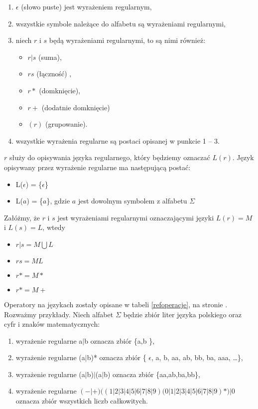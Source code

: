 \begin{enumerate}
 \item    $\epsilon$ (słowo puste) jest wyrażeniem regularnym,
 \item wszystkie symbole należące do alfabetu są wyrażeniami regularnymi,
 \item niech $r$ i $s$ będą wyrażeniami regularnymi, to są nimi również:
      \begin{itemize}
	\item	$r|s$  (suma),
	\item	$rs$   (łączność) ,
	\item   $r*$   (domknięcie),
	\item   $r+$   (dodatnie domknięcie)
	\item   $(r)$  (grupowanie).
      \end{itemize}
\item wszystkie wyrażenia regularne są postaci opisanej w punkcie 1 -- 3.
    



      
\end{enumerate}
 $r$ służy do opisywania języka regularnego, który będziemy oznaczać $L(r)$.
Język opisywany przez wyrażenie regularne ma następującą postać:
  \begin{itemize}
   
   \item L($\epsilon$) = \{$\epsilon$\}
   \item L($a$) = \{$a$\}, gdzie $a$ jest dowolnym symbolem z alfabetu $\Sigma$
  \end{itemize}

Załóżmy, że $r$ i $s$ jest wyrażeniami regularnymi oznaczającymi języki $L(r)=M$ i $L(s)=L$, wtedy
    \begin{itemize}
     \item $r|s = M\bigcup L$
     \item $rs  = ML$
     \item $r*  = M*$
     \item $r*  = M+$
    \end{itemize}
Operatory na językach zostały opisane w tabeli \ref{refoperacje}, na stronie \pageref{refoperacje}. 
Rozważmy przykłady. Niech alfabet $\Sigma$ będzie zbiór liter języka polskiego oraz cyfr i znaków matematycznych:
  \begin{enumerate}
   \item wyrażenie regularne a$|$b oznacza zbiór \{a,b \},
   \item wyrażenie regularne (a$|$b)* oznacza zbiór \{ $\epsilon$, a, b, aa, ab, bb, ba, aaa, \dots \},
   \item wyrażenie regularne (a$|$b)$|$(a$|$b) oznacza zbiór \{aa,ab,ba,bb\}, 
   \item wyrażenie regularne  $ (-|+) ((1|2|3|4|5|6|7|8|9)(0|1|2|3|4|5|6|7|8|9)*)|0  $ oznacza zbiór wszystkich liczb całkowitych. 	
  \end{enumerate}


